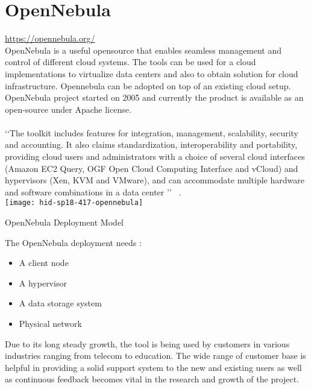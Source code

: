 
\graphicspath{ {images/} }
\section{OpenNebula}
\url{https://opennebula.org/} \\ 
   
OpenNebula is a useful opensource that enables seamless management and control of different cloud systems.
The tools can be used for a cloud implementations 
to virtualize data centers and also to obtain solution for cloud infrastructure.
Opennebula can be adopted on top of an existing cloud setup.
OpenNebula project started on 2005 and currently the product is available as an open-source under Apache license. \\
\\
‘‘The toolkit includes features for integration, management, scalability, security and accounting.
It also claims standardization, interoperability and portability, providing cloud users and administrators with a choice of several
cloud interfaces (Amazon EC2 Query, OGF Open Cloud Computing Interface and vCloud) and hypervisors
(Xen, KVM and VMware), and can accommodate multiple hardware and software combinations in a data center ’’
~\cite{hid-sp18-417-opennebula-wiki}.\\

\texttt{[image: hid-sp18-417-opennebula]}
\begin{center}
OpenNebula Deployment Model ~\cite{hid-sp18-417-opennebula-deployment} 
\end{center}

The OpenNebula deployment needs :
\begin{itemize}
\item        A client node
\item        A hypervisor
\item        A data storage system
\item        Physical network
\end{itemize}

Due to its long steady growth, the tool is being used by customers in various industries ranging from telecom to education.
The wide range of customer base is helpful in providing a solid support system to the new and existing users as well as continuous
feedback becomes vital in the research and growth of the project. 


